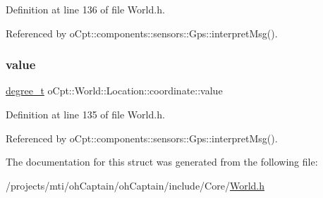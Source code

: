 Definition at line 136 of file World.\+h.



Referenced by o\+Cpt\+::components\+::sensors\+::\+Gps\+::interpret\+Msg().

\hypertarget{structo_cpt_1_1_world_1_1_location_1_1coordinate_aca0e4502963b1f4149d064833e3a502c}{}\label{structo_cpt_1_1_world_1_1_location_1_1coordinate_aca0e4502963b1f4149d064833e3a502c} 
\subsubsection{\texorpdfstring{value}{value}}
{\footnotesize\ttfamily \hyperlink{classo_cpt_1_1_world_1_1_location_a896d36a393f64f80cb4756134477da14}{degree\+\_\+t} o\+Cpt\+::\+World\+::\+Location\+::coordinate\+::value}



Definition at line 135 of file World.\+h.



Referenced by o\+Cpt\+::components\+::sensors\+::\+Gps\+::interpret\+Msg().



The documentation for this struct was generated from the following file\+:\begin{DoxyCompactItemize}
\item 
/projects/mti/oh\+Captain/oh\+Captain/include/\+Core/\hyperlink{_world_8h}{World.\+h}\end{DoxyCompactItemize}
